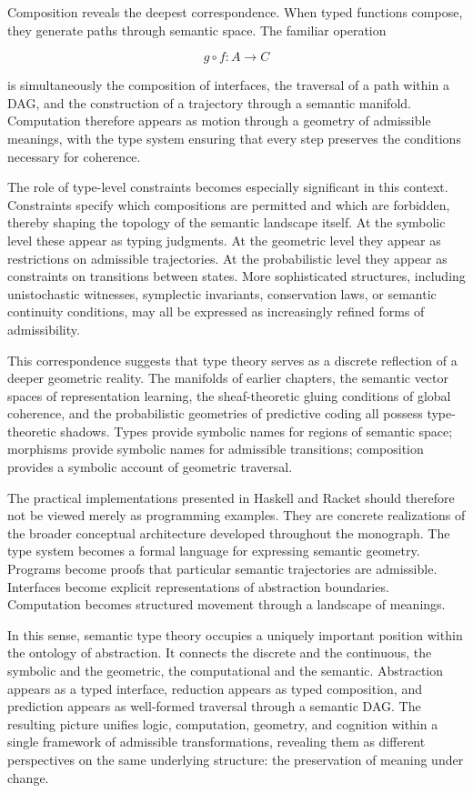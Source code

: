\documentclass[12pt,letterpaper]{article}
\theoremstyle{remark}
\begin{document}
Composition reveals the deepest correspondence. When typed functions compose, they generate paths through semantic space. The familiar operation

\[
g \circ f : A \to C
\]

is simultaneously the composition of interfaces, the traversal of a path within a DAG, and the construction of a trajectory through a semantic manifold. Computation therefore appears as motion through a geometry of admissible meanings, with the type system ensuring that every step preserves the conditions necessary for coherence.

The role of type-level constraints becomes especially significant in this context. Constraints specify which compositions are permitted and which are forbidden, thereby shaping the topology of the semantic landscape itself. At the symbolic level these appear as typing judgments. At the geometric level they appear as restrictions on admissible trajectories. At the probabilistic level they appear as constraints on transitions between states. More sophisticated structures, including unistochastic witnesses, symplectic invariants, conservation laws, or semantic continuity conditions, may all be expressed as increasingly refined forms of admissibility.

This correspondence suggests that type theory serves as a discrete reflection of a deeper geometric reality. The manifolds of earlier chapters, the semantic vector spaces of representation learning, the sheaf-theoretic gluing conditions of global coherence, and the probabilistic geometries of predictive coding all possess type-theoretic shadows. Types provide symbolic names for regions of semantic space; morphisms provide symbolic names for admissible transitions; composition provides a symbolic account of geometric traversal.

The practical implementations presented in Haskell and Racket should therefore not be viewed merely as programming examples. They are concrete realizations of the broader conceptual architecture developed throughout the monograph. The type system becomes a formal language for expressing semantic geometry. Programs become proofs that particular semantic trajectories are admissible. Interfaces become explicit representations of abstraction boundaries. Computation becomes structured movement through a landscape of meanings.

In this sense, semantic type theory occupies a uniquely important position within the ontology of abstraction. It connects the discrete and the continuous, the symbolic and the geometric, the computational and the semantic. Abstraction appears as a typed interface, reduction appears as typed composition, and prediction appears as well-formed traversal through a semantic DAG. The resulting picture unifies logic, computation, geometry, and cognition within a single framework of admissible transformations, revealing them as different perspectives on the same underlying structure: the preservation of meaning under change.
\end{document}

